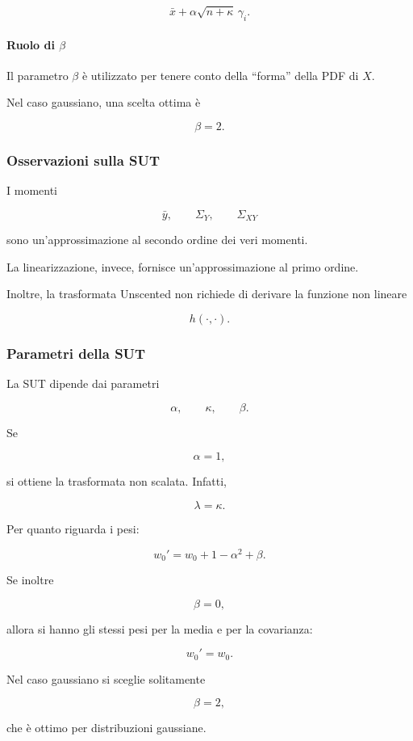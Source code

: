 \documentclass[11pt,a4paper]{article}
\begin{document}
\[
\bar x+\alpha\sqrt{n+\kappa}\,\gamma_i.
\]

\paragraph{Ruolo di \(\beta\)}

Il parametro \(\beta\) è utilizzato per tenere conto della ``forma'' della PDF di \(X\).

Nel caso gaussiano, una scelta ottima è

\[
\beta=2.
\]

\subsubsection*{Osservazioni sulla SUT}

I momenti

\[
\bar y,\qquad \Sigma_Y,\qquad \Sigma_{XY}
\]

sono un'approssimazione al secondo ordine dei veri momenti.

La linearizzazione, invece, fornisce un'approssimazione al primo ordine.

Inoltre, la trasformata Unscented non richiede di derivare la funzione non lineare

\[
h(\cdot,\cdot).
\]

\subsubsection*{Parametri della SUT}

La SUT dipende dai parametri

\[
\alpha,\qquad \kappa,\qquad \beta.
\]

Se

\[
\alpha=1,
\]

si ottiene la trasformata non scalata. Infatti,

\[
\lambda=\kappa.
\]

Per quanto riguarda i pesi:

\[
w_0' = w_0 + 1-\alpha^2+\beta.
\]

Se inoltre

\[
\beta=0,
\]

allora si hanno gli stessi pesi per la media e per la covarianza:

\[
w_0'=w_0.
\]

Nel caso gaussiano si sceglie solitamente

\[
\beta=2,
\]

che è ottimo per distribuzioni gaussiane.
\end{document}
